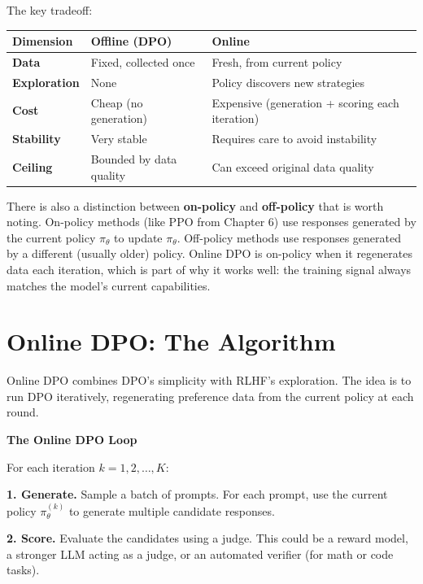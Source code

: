 \begin{chapterenv}
The key tradeoff:

\begin{center}
\begin{tabular}{p{}p{}p{}}
\toprule
\textbf{Dimension} & \textbf{Offline (DPO)} & \textbf{Online} \\
\midrule
\textbf{Data} & Fixed, collected once & Fresh, from current policy \\
\textbf{Exploration} & None & Policy discovers new strategies \\
\textbf{Cost} & Cheap (no generation) & Expensive (generation + scoring each iteration) \\
\textbf{Stability} & Very stable & Requires care to avoid instability \\
\textbf{Ceiling} & Bounded by data quality & Can exceed original data quality \\
\bottomrule
\end{tabular}
\end{center}

There is also a distinction between \textbf{on-policy} and \textbf{off-policy} that is worth noting. On-policy methods (like PPO from Chapter 6) use responses generated by the current policy $\pi_\theta$ to update $\pi_\theta$. Off-policy methods use responses generated by a different (usually older) policy. Online DPO is on-policy when it regenerates data each iteration, which is part of why it works well: the training signal always matches the model's current capabilities.

\section{Online DPO: The Algorithm}

Online DPO combines DPO's simplicity with RLHF's exploration. The idea is to run DPO iteratively, regenerating preference data from the current policy at each round.

\begin{infobox}
\textbf{The Online DPO Loop}

For each iteration $k = 1, 2, \ldots, K$:

\textbf{1. Generate.} Sample a batch of prompts. For each prompt, use the current policy $\pi_\theta^{(k)}$ to generate multiple candidate responses.

\textbf{2. Score.} Evaluate the candidates using a judge. This could be a reward model, a stronger LLM acting as a judge, or an automated verifier (for math or code tasks).


\end{infobox}
\end{chapterenv}
